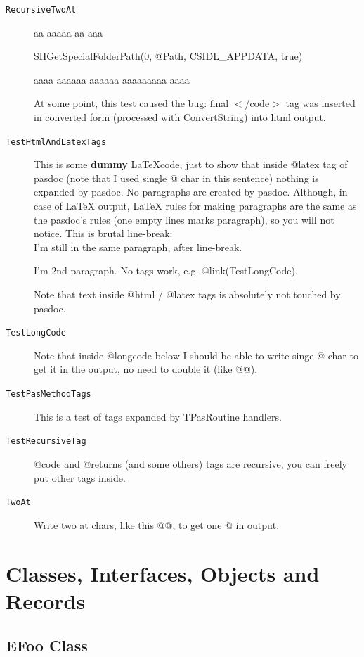 \documentclass{report}
\newif\ifpdf
\begin{document}
\begin{description}
\item[\texttt{RecursiveTwoAt}]aa aaaaa aa aaa \begin{ttfamily}SHGetSpecialFolderPath(0, @Path, CSIDL{\_}APPDATA, true)\end{ttfamily} aaaa aaaaaa aaaaaa aaaaaaaaa aaaa

At some point, this test caused the bug: final {$<$}/code{$>$} tag was inserted in converted form (processed with ConvertString) into html output.
\item[\texttt{TestHtmlAndLatexTags}]


    This is some {\bf dummy} \LaTeX code, just to show that inside
    @latex tag of pasdoc (note that I used single @ char in this sentence)
    nothing is expanded by pasdoc.
    No paragraphs are created by pasdoc. Although, in case of LaTeX output,
    LaTeX rules for making paragraphs are the same as the pasdoc's rules
    (one empty lines marks paragraph), so you will not notice.
    This is brutal line-break: \\
    I'm still in the same paragraph, after line-break.

    I'm 2nd paragraph.
    No tags work, e.g. @link(TestLongCode).
  

Note that text inside @html / @latex tags is absolutely not touched by pasdoc.
\item[\texttt{TestLongCode}]Note that inside @longcode below I should be able to write singe @ char to get it in the output, no need to double it (like @@).
\item[\texttt{TestPasMethodTags}]This is a test of tags expanded by TPasRoutine handlers.
\item[\texttt{TestRecursiveTag}]@code and @returns (and some others) tags are recursive, you can freely put other tags inside.
\item[\texttt{TwoAt}]Write two at chars, like this @@, to get one @ in output.
\end{description}
\section{Classes, Interfaces, Objects and Records}
\ifpdf
\subsection*{\large{\textbf{EFoo Class}}\normalsize\hspace{1ex}\hrulefill}
\else
\subsection*{EFoo Class}
\fi
\label{ok_expanding_descriptions.EFoo}
\end{document}
